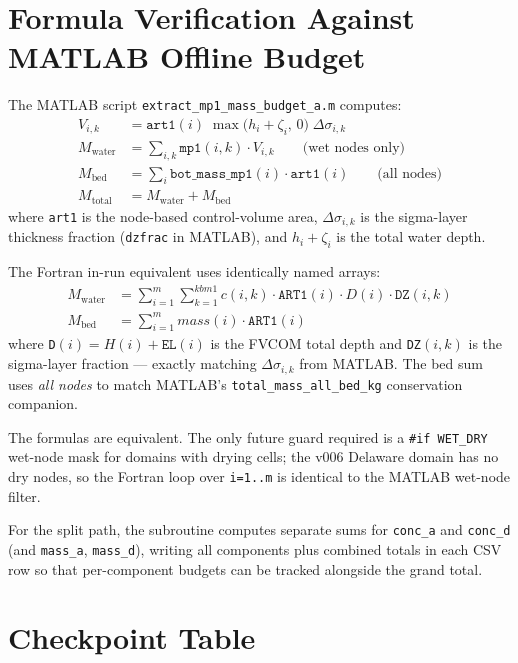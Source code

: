 \documentclass[11pt]{article}
\begin{document}
\section*{Formula Verification Against MATLAB Offline Budget}

The MATLAB script \texttt{extract\_mp1\_mass\_budget\_a.m} computes:
\begin{align*}
  V_{i,k} &= \texttt{art1}(i)\;\max\!\bigl(h_i + \zeta_i,\,0\bigr)\;\Delta\sigma_{i,k}\\
  M_\text{water} &= \sum_{i,k} \texttt{mp1}(i,k)\cdot V_{i,k}
                  \qquad \text{(wet nodes only)}\\
  M_\text{bed}   &= \sum_{i} \texttt{bot\_mass\_mp1}(i)\cdot\texttt{art1}(i)
                  \qquad \text{(all nodes)}\\
  M_\text{total} &= M_\text{water} + M_\text{bed}
\end{align*}
where \texttt{art1} is the node-based control-volume area, \(\Delta\sigma_{i,k}\)
is the sigma-layer thickness fraction (\texttt{dzfrac} in MATLAB), and
\(h_i+\zeta_i\) is the total water depth.

The Fortran in-run equivalent uses identically named arrays:
\begin{align*}
  M_\text{water} &= \sum_{i=1}^{m}\sum_{k=1}^{kbm1}
        c(i,k)\cdot\texttt{ART1}(i)\cdot D(i)\cdot\texttt{DZ}(i,k)\\
  M_\text{bed}   &= \sum_{i=1}^{m} \textit{mass}(i)\cdot\texttt{ART1}(i)
\end{align*}
where \texttt{D}$(i) = H(i)+\texttt{EL}(i)$ is the FVCOM total depth and
\texttt{DZ}$(i,k)$ is the sigma-layer fraction --- exactly matching
$\Delta\sigma_{i,k}$ from MATLAB.  The bed sum uses \emph{all nodes} to match
MATLAB's \texttt{total\_mass\_all\_bed\_kg} conservation companion.

The formulas are equivalent.  The only future guard required is a
\texttt{\#if WET\_DRY} wet-node mask for domains with drying cells; the v006
Delaware domain has no dry nodes, so the Fortran loop over \texttt{i=1..m} is
identical to the MATLAB wet-node filter.

For the split path, the subroutine computes separate sums for \texttt{conc\_a}
and \texttt{conc\_d} (and \texttt{mass\_a}, \texttt{mass\_d}), writing all
components plus combined totals in each CSV row so that per-component budgets can
be tracked alongside the grand total.

\section*{Checkpoint Table}
\end{document}
